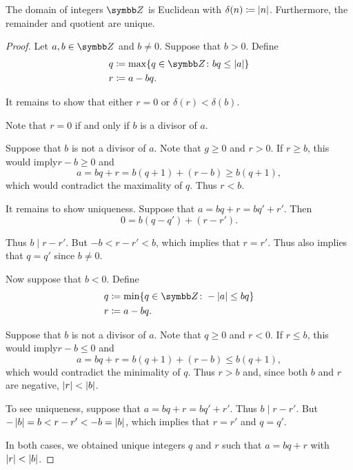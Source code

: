 \begin{proposition}\label{thm:integers_are_euclidean_domain}
  The domain of integers \( \Z \) is Euclidean with \( \delta(n) \coloneqq \left\vert n \right\vert \). Furthermore, the remainder and quotient are unique.
\end{proposition}
\begin{proof}
  Let \( a, b \in \Z \) and \( b \neq 0 \). Suppose that \( b > 0 \). Define
  \begin{align*}
    q &\coloneqq \max \{ q \in \Z \colon bq \leq \Abs{a} \} \\
    r &\coloneqq a - bq.
  \end{align*}

  It remains to show that either \( r = 0 \) or \( \delta(r) < \delta(b) \).

  Note that \( r = 0 \) if and only if \( b \) is a divisor of \( a \).

  Suppose that \( b \) is not a divisor of \( a \). Note that \( g \geq 0 \) and \( r > 0 \). If \( r \geq b \), this would imply\LEM \( r - b \geq 0 \) and
  \begin{equation*}
    a = bq + r = b(q + 1) + (r - b) \geq b(q + 1),
  \end{equation*}
  which would contradict the maximality of \( q \). Thus \( r < b \).

  It remains to show uniqueness. Suppose that \( a = bq + r = bq' + r' \). Then
  \begin{equation*}
    0 = b(q - q') + (r - r').
  \end{equation*}

  Thus \( b \mid r - r' \). But \( -b < r - r' < b \), which implies that \( r = r' \). Thus also implies that \( q = q' \) since \( b \neq 0 \).

  Now suppose that \( b < 0 \). Define
  \begin{align*}
    q &\coloneqq \min \{ q \in \Z \colon -\Abs{a} \leq bq \} \\
    r &\coloneqq a - bq.
  \end{align*}

  Suppose that \( b \) is not a divisor of \( a \). Note that \( q \geq 0 \) and \( r < 0 \). If \( r \leq b \), this would imply\LEM \( r - b \leq 0 \) and
  \begin{equation*}
    a = bq + r = b(q + 1) + (r - b) \leq b(q + 1),
  \end{equation*}
  which would contradict the minimality of \( q \). Thus \( r > b \) and, since both \( b \) and \( r \) are negative, \( \left\vert r \right\vert < \left\vert b \right\vert \).

  To see uniqueness, suppose that \( a = bq + r = bq' + r' \). Thus \( b \mid r - r' \). But \( -\left\vert b \right\vert = b < r - r' < -b = \left\vert b \right\vert \), which implies that \( r = r' \) and \( q = q' \).

  In both cases, we obtained unique integers \( q \) and \( r \) such that \( a = bq + r \) with \( \left\vert r \right\vert < \left\vert b \right\vert \).
\end{proof}


